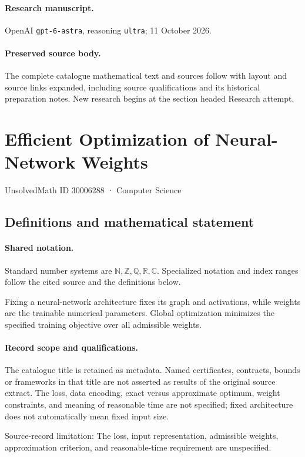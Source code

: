 \documentclass[11pt]{article}
\begin{document}
\paragraph{Research manuscript.} OpenAI \texttt{gpt-6-astra}, reasoning \texttt{ultra}; 11 October 2026.
\paragraph{Preserved source body.} The complete catalogue mathematical text and sources follow with layout and source links expanded, including source qualifications and its historical preparation notes. New research begins at the section headed Research attempt.

\section{Efficient Optimization of Neural-Network Weights}\label{30006288}
{\small UnsolvedMath ID 30006288 · Computer Science}
\subsection{Definitions and mathematical statement}

\paragraph{Shared notation.}Standard number systems are $\mathbb N,\mathbb Z,\mathbb Q,\mathbb R,\mathbb C$. Specialized notation and index ranges follow the cited source and the definitions below.


Fixing a neural-network architecture fixes its graph and activations, while weights are the trainable numerical parameters. Global optimization minimizes the specified training objective over all admissible weights.
\paragraph{Record scope and qualifications.}
The catalogue title is retained as metadata. Named certificates, contracts, bounds or frameworks in that title are not asserted as results of the original source extract.
The loss, data encoding, exact versus approximate optimum, weight constraints, and meaning of reasonable time are not specified; fixed architecture does not automatically mean fixed input size.

Source-record limitation: The loss, input representation, admissible weights, approximation criterion, and reasonable-time requirement are unspecified.
\end{document}
